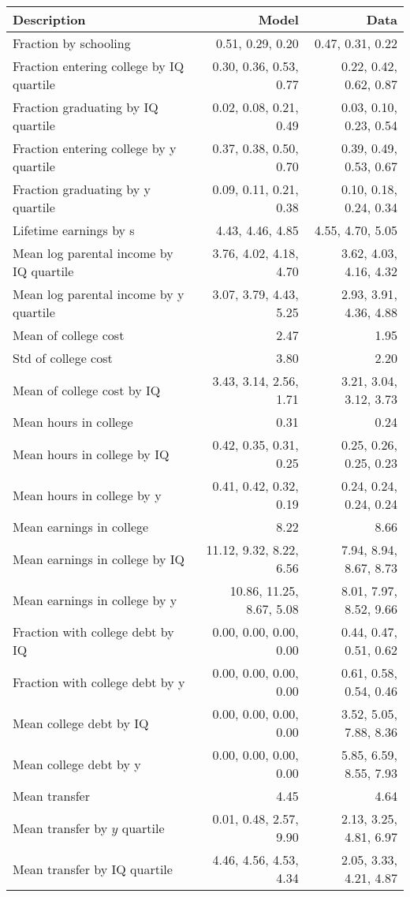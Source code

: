 \begin{tabular}{lrr}
\hline
Description & Model  & Data  \\
\hline
Fraction by schooling & 0.51, 0.29, 0.20  & 0.47, 0.31, 0.22  \\
Fraction entering college by IQ quartile & 0.30, 0.36, 0.53, 0.77  & 0.22, 0.42, 0.62, 0.87  \\
Fraction graduating by IQ quartile & 0.02, 0.08, 0.21, 0.49  & 0.03, 0.10, 0.23, 0.54  \\
Fraction entering college by y quartile & 0.37, 0.38, 0.50, 0.70  & 0.39, 0.49, 0.53, 0.67  \\
Fraction graduating by y quartile & 0.09, 0.11, 0.21, 0.38  & 0.10, 0.18, 0.24, 0.34  \\
Lifetime earnings by s & 4.43, 4.46, 4.85  & 4.55, 4.70, 5.05  \\
Mean log parental income by IQ quartile & 3.76, 4.02, 4.18, 4.70  & 3.62, 4.03, 4.16, 4.32  \\
Mean log parental income by y quartile & 3.07, 3.79, 4.43, 5.25  & 2.93, 3.91, 4.36, 4.88  \\
Mean of college cost & 2.47  & 1.95  \\
Std of college cost & 3.80  & 2.20  \\
Mean of college cost by IQ & 3.43, 3.14, 2.56, 1.71  & 3.21, 3.04, 3.12, 3.73  \\
Mean hours in college & 0.31  & 0.24  \\
Mean hours in college by IQ & 0.42, 0.35, 0.31, 0.25  & 0.25, 0.26, 0.25, 0.23  \\
Mean hours in college by y & 0.41, 0.42, 0.32, 0.19  & 0.24, 0.24, 0.24, 0.24  \\
Mean earnings in college & 8.22  & 8.66  \\
Mean earnings in college by IQ & 11.12, 9.32, 8.22, 6.56  & 7.94, 8.94, 8.67, 8.73  \\
Mean earnings in college by y & 10.86, 11.25, 8.67, 5.08  & 8.01, 7.97, 8.52, 9.66  \\
Fraction with college debt by IQ & 0.00, 0.00, 0.00, 0.00  & 0.44, 0.47, 0.51, 0.62  \\
Fraction with college debt by y & 0.00, 0.00, 0.00, 0.00  & 0.61, 0.58, 0.54, 0.46  \\
Mean college debt by IQ & 0.00, 0.00, 0.00, 0.00  & 3.52, 5.05, 7.88, 8.36  \\
Mean college debt by y & 0.00, 0.00, 0.00, 0.00  & 5.85, 6.59, 8.55, 7.93  \\
Mean transfer & 4.45  & 4.64  \\
Mean transfer by $y$ quartile & 0.01, 0.48, 2.57, 9.90  & 2.13, 3.25, 4.81, 6.97  \\
Mean transfer by IQ quartile & 4.46, 4.56, 4.53, 4.34  & 2.05, 3.33, 4.21, 4.87  \\
\hline
\end{tabular}%
